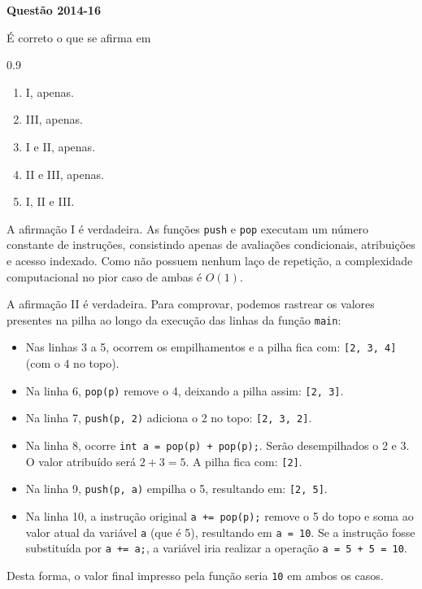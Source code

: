 \documentclass[12pt,a4paper]{article}
\newenvironment{question}[1]{%
    \pdfbookmark[3]{Questão #1}{q:#1}
    \label{q:#1}
    \bigskip\par\noindent
    \textbf{Questão #1} \dotfill
    \medskip\par\nopagebreak\noindent
    \ignorespaces
}{%
    \noindent\dotfill\medskip
}
\begin{document}
\begin{question}{2014-16}
\noindent
É correto o que se afirma em

\begin{spacing}{0.9}
\begin{small}
\begin{enumerate}[label=\Alph*)]
    \item I, apenas.
    \item III, apenas.
    \item I e II, apenas.
    \item II e III, apenas.
    \item I, II e III.
\end{enumerate}
\end{small}
\end{spacing}
\end{question}

A afirmação I é verdadeira. As funções \texttt{push} e \texttt{pop} executam um número constante de instruções,
consistindo apenas de avaliações condicionais, atribuições e acesso indexado.
Como não possuem nenhum laço de repetição, a complexidade computacional no pior caso de ambas é $O(1)$.

A afirmação II é verdadeira. Para comprovar, podemos rastrear os valores presentes na pilha ao longo da execução das linhas da função \texttt{main}:
\begin{small}
\begin{itemize}
    \item Nas linhas 3 a 5, ocorrem os empilhamentos e a pilha fica com: \texttt{[2, 3, 4]} (com o 4 no topo).
    \item Na linha 6, \texttt{pop(p)} remove o 4, deixando a pilha assim: \texttt{[2, 3]}.
    \item Na linha 7, \texttt{push(p, 2)} adiciona o 2 no topo: \texttt{[2, 3, 2]}.
    \item Na linha 8, ocorre \texttt{int a = pop(p) + pop(p);}. Serão desempilhados o 2 e 3. O valor atribuído será $2 + 3 = 5$. A pilha fica com: \texttt{[2]}.
    \item Na linha 9, \texttt{push(p, a)} empilha o 5, resultando em: \texttt{[2, 5]}.
    \item Na linha 10, a instrução original \texttt{a += pop(p);} remove o 5 do topo e soma ao valor atual da variável \texttt{a} (que é 5),
    resultando em \texttt{a = 10}. Se a instrução fosse substituída por \texttt{a += a;}, a variável iria realizar a operação \texttt{a = 5 + 5 = 10}.
\end{itemize}
\end{small}
Desta forma, o valor final impresso pela função seria \texttt{10} em ambos os casos.
\end{document}
